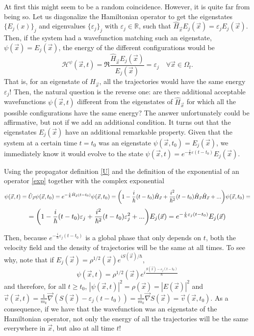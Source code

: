 \documentclass[11pt, a4paper]{article} %
\newcommand{\R}{\mathbb{R}} %
\newcommand{\h}{\mathcal{H}}
\DeclareRobustCommand{\mybox}[2][gray!10]{%
\begin{tcolorbox}[   %
        left=0.2cm,
        right=0.2cm,
        top=0.15cm,
        bottom=0.15cm,
        colback=#1,
        colframe=#1,
        width=\dimexpr\textwidth\relax, 
        enlarge left by=0mm,
        boxsep=5pt,
        arc=0pt,outer arc=0pt,
        ]
        #2
\end{tcolorbox}
}
\begin{document}
At first this might seem to be a random coincidence. However, it is quite far from being so. Let us diagonalize the Hamiltonian operator to get the eigenstates $\{E_j(x)\}_j$ and eigenvalues $\{\varepsilon_j\}_j$ with $\varepsilon_j\in\R$, such that $\hat{H}_{\vec{x}}E_j(\vec{x})=\varepsilon_j E_j(\vec{x})$. Then, if the system had a wavefunction matching such an eigenstate, $\psi(\vec{x})=E_j(\vec{x})$, the energy of the different configurations would be
\begin{equation}
\h^\psi(\vec{x},t)=\Re{\frac{\hat{H}_{\vec{x}}E_j(\vec{x})}{E_j(\vec{x})}}=\varepsilon_j\quad \forall \vec{x}\in\Omega_t.
\end{equation}
That is, for an eigenstate of $\hat{H}_{\vec{x}}$, all the trajectories would have the same energy $\varepsilon_j$! Then, the natural question is the reverse one: are there additional acceptable wavefunctions $\psi(\vec{x},t)$ different from the eigenstates of $\hat{H}_{\vec{x}}$ for which all the possible configurations have the same energy? The answer unfortunately could be affirmative, but not if we add an additional condition. It turns out that the eigenstates $E_j(\vec{x})$ have an additional remarkable property. Given that the system at a certain time $t=t_0$ was an eigenstate $\psi(\vec{x},t_0)=E_j(\vec{x})$, we immediately know it would evolve to the state $\psi(\vec{x},t)=e^{-\frac{i}{\hbar}\varepsilon (t-t_0)}E_j(\vec{x})$.

\mybox{
Using the propagator definition \eqref{U} and the definition of the exponential of an operator \eqref{exp} together with the complex exponential
\begin{equation}
\psi(\vec{x},t)=\hat{U}_{\vec{x}}\psi(\vec{x},t_0)=e^{-\frac{i}{\hbar}\hat{H}_{\vec{x}}(t-t_0)}\psi(\vec{x},t_0)=\qty(1-\frac{i}{\hbar}(t-t_0)\hat{H}_{\vec{x}}+\frac{i^2}{\hbar^2}(t-t_0)\hat{H}_{\vec{x}}\hat{H}_{\vec{x}}+...)\psi(\vec{x},t_0)=
\end{equation}
$$
=\qty(1-\frac{i}{\hbar}(t-t_0)\varepsilon_j+\frac{i^2}{\hbar^2}(t-t_0)\varepsilon_j^2+...)E_j(\vec{x})=e^{-\frac{i}{\hbar}\varepsilon_j (t-t_0)}E_j(\vec{x})
$$
}
Then, because $e^{-\frac{i}{\hbar}\varepsilon_j (t-t_0)}$ is a global phase that only depends on $t$, both the velocity field and the density of trajectories will be the same at all times. To see why, note that if $E_j(\vec{x})=\rho^{1/2}(\vec{x})e^{iS(\vec{x})/\hbar}$,
\begin{equation}
\psi(\vec{x},t)=\rho^{1/2}(\vec{x})e^{i\frac{S(\vec{x})-\varepsilon_j(t-t_0)}{\hbar}}
\end{equation} 
and therefore, for all $t\geq t_0$, $|\psi(\vec{x},t)|^2=\rho(\vec{x})=|E(\vec{x})|^2$ and $\vec{v}(\vec{x},t)=\frac{1}{m_k}\vec{\nabla}(S(\vec{x})-\varepsilon_j(t-t_0))=\frac{1}{m_k}\vec{\nabla}S(\vec{x})=\vec{v}(\vec{x},t_0)$. As a consequence, if we have that the wavefunction was an eigenstate of the Hamiltonian operator, not only the energy of all the trajectories will be the same everywhere in $\vec{x}$, but also at all time $t$!
\end{document}
